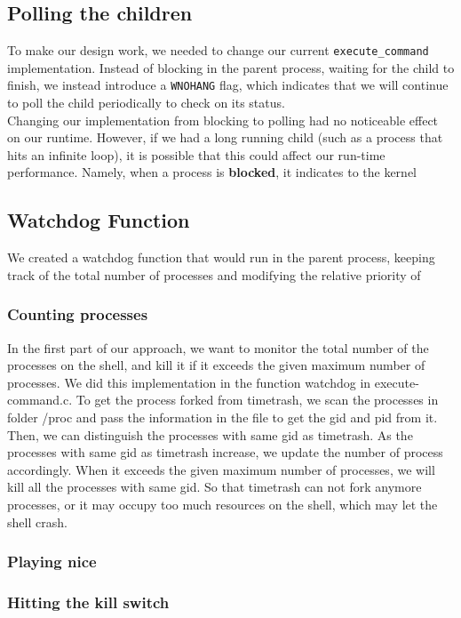 \documentclass{article}
\begin{document}
\subsection{Polling the children}
To make our design work, we needed to change our current \verb+execute_command+
implementation. Instead of blocking in the parent process, waiting for the
child to finish, we instead introduce a \verb+WNOHANG+ flag, which indicates
that we will continue to poll the child periodically to check on its status. \\
Changing our implementation from blocking to polling had no noticeable effect
on our runtime. However, if we had a long running child (such as a process that
hits an infinite loop), it is possible that this could affect our run-time 
performance. Namely, when a process is \textbf{blocked}, it indicates to the 
kernel 
\subsection{Watchdog Function}
We created a watchdog function that would run in the parent process, keeping
track of the total number of processes and modifying the relative priority of

\subsubsection{Counting processes}


In the first part of our approach, we want to monitor the total number of the processes on the shell, and kill it if it exceeds the given maximum number of processes.
We did this implementation in the function watchdog in execute-command.c.  To get the process forked from timetrash, we scan the processes in folder /proc and pass the information in the file to get the gid and pid from it.  Then, we can distinguish the processes with same gid as timetrash.  As the processes with same gid as timetrash increase, we update the number of process accordingly.  When it exceeds the given maximum number of processes, we will kill all the processes with same gid.  So that timetrash can not fork anymore processes, or it may occupy too much resources on the shell, which may let the shell crash. \\

\subsubsection{Playing nice}
\subsubsection{Hitting the kill switch}
\end{document}
